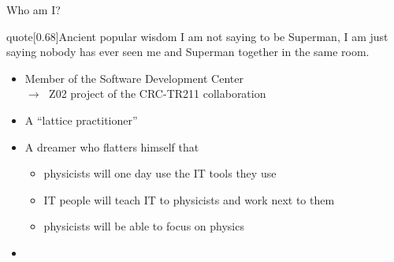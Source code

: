 \begin{frame}{Who am I?}
    \begin{varblock}{quote}[0.68\textwidth]{Ancient popular wisdom}
        \guillemotleft{}I am not saying to be Superman, I am just saying nobody has ever seen me and Superman together in the same room.\guillemotright
    \end{varblock}
    \vspace{5mm}
    \begin{itemize}
        \item Member of the Software Development Center \\ $\to\;$ Z02 project of the CRC-TR211 collaboration
        \item A ``lattice practitioner''
        \item A dreamer who flatters himself that
              \begin{itemize}
                  \item physicists will one day  use the IT tools they use
                  \item IT people will teach IT to physicists and work next to them
                  \item physicists will be able to focus on physics
              \end{itemize}
        \item {}
    \end{itemize}
\end{frame}
